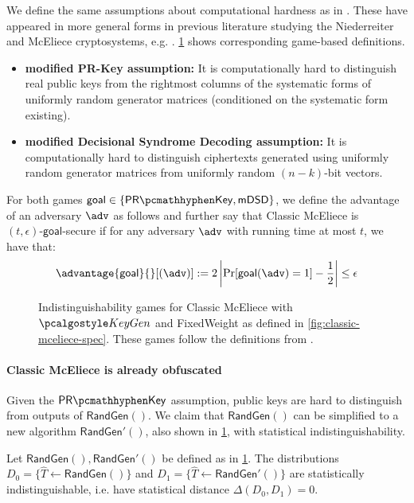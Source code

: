We define the same assumptions about computational hardness as in \cite[Definition~K.1]{EC:Xagawa22}. These have appeared in more general forms in previous literature studying the Niederreiter and McEliece cryptosystems, e.g. \cite{AC:CouFinSen01,EC:SaiXagYam18}. \cref{fig:classic-mceliece-assumptions} shows corresponding game-based definitions.
\begin{itemize}
    \item \textbf{modified PR-Key assumption:} It is computationally hard to distinguish real public keys from the rightmost columns of the systematic forms of uniformly random generator matrices (conditioned on the systematic form existing).
    \item \textbf{modified Decisional Syndrome Decoding assumption:} It is computationally hard to distinguish ciphertexts generated using uniformly random generator matrices from uniformly random $(n-k)$-bit vectors.
\end{itemize}

For both games $\textsf{goal} \in \{\prkey, \mdsd\}$, we define the advantage of an adversary $\adv$ as follows and further say that Classic McEliece is $(t, \epsilon)\textsf{-goal}$-secure if for any adversary $\adv$ with running time at most $t$, we have that:
\[ \advantage{\textsf{goal}}{}[(\adv)] := 2 \left| \Pr[\textsf{goal}(\adv) = 1] - \frac{1}{2} \right| \leq \epsilon \]

\begin{figure}
    
    \caption{Indistinguishability games for Classic McEliece with $\kgen$ and \textsf{FixedWeight} as defined in \cref{fig:classic-mceliece-spec}. These games follow the definitions from \cite[Definition~K.1]{EC:Xagawa22}.}
    \label{fig:classic-mceliece-assumptions}
\end{figure}

\paragraph{Classic McEliece is already obfuscated}

Given the $\prkey$ assumption, public keys are hard to distinguish from outputs of $\textsf{RandGen}()$. We claim that $\textsf{RandGen}()$ can be simplified to a new algorithm $\textsf{RandGen}'()$, also shown in \cref{fig:classic-mceliece-assumptions}, with statistical indistinguishability.

\begin{lemma} \label{lem:classic-mceliece-randgen-prime}
    Let $\textsf{RandGen}(), \textsf{RandGen}'()$ be defined as in \cref{fig:classic-mceliece-assumptions}.
    The distributions $D_0 = \{ \hat T \gets \textsf{RandGen}() \}$ and $D_1 = \{ \hat T \gets \textsf{RandGen}'() \}$ are statistically indistinguishable, i.e. have statistical distance $\Delta(D_0, D_1) = 0$.
\end{lemma}

